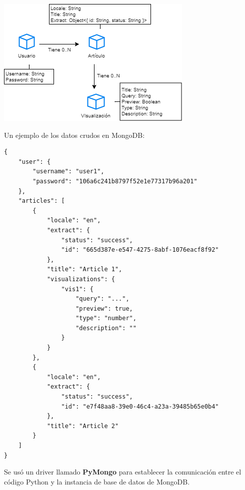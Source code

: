 \begin{center}
    \bigbreak
    \includegraphics[scale=0.9]{images/marco_aplicativo/db_model.png}
    \label{fig:db_model}
    \bigbreak
\end{center}

Un ejemplo de los datos crudos en MongoDB: 
\begin{verbatim}
{
    "user": {
        "username": "user1",
        "password": "106a6c241b8797f52e1e77317b96a201"
    },
    "articles": [
        {
            "locale": "en",
            "extract": {
                "status": "success",
                "id": "665d387e-e547-4275-8abf-1076eacf8f92"
            },
            "title": "Article 1",
            "visualizations": {
                "vis1": {
                    "query": "...",
                    "preview": true,
                    "type": "number",
                    "description": ""
                }
            }
        },
        {
            "locale": "en",
            "extract": {
                "status": "success",
                "id": "e7f48aa8-39e0-46c4-a23a-39485b65e0b4"
            },
            "title": "Article 2"
        }
    ]
}
\end{verbatim}

Se usó un driver llamado \textbf{PyMongo} para establecer la comunicación entre el código Python y la instancia de base de datos de MongoDB.





  
  

